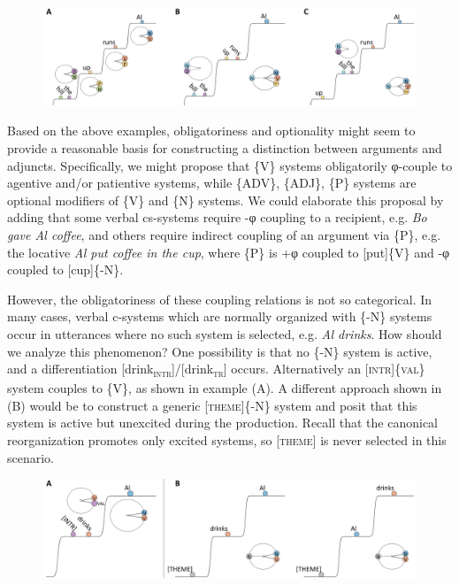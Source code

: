   
\begin{figure}
\includegraphics[width=\textwidth]{figures/Tilsen-img85.png}
\caption{\missingcaption}
\label{fig:4:35}
\end{figure}
 

  Based on the above examples, obligatoriness and optionality might seem to provide a reasonable basis for constructing a distinction between arguments and adjuncts. Specifically, we might propose that \{V\} systems obligatorily φ-couple to agentive and/or patientive systems, while \{ADV\}, \{ADJ\}, \{P\} systems are optional modifiers of \{V\} and \{N\} systems. We could elaborate this proposal by adding that some verbal cs-systems require -φ coupling to a recipient, e.g. \textit{Bo gave Al coffee}, and others require indirect coupling of an argument via \{P\}, e.g. the locative \textit{Al put coffee in the cup}, where \{P\} is +φ coupled to [put]\{V\} and -φ coupled to [cup]\{-N\}.

  However, the obligatoriness of these coupling relations is not so categorical. In many cases, verbal c-systems which are normally organized with \{-N\} systems occur in utterances where no such system is selected, e.g. \textit{Al drinks}. How should we analyze this phenomenon? One possibility is that no \{-N\} system is active, and a differentiation [drink\textsc{\textsubscript{intr}}]/[drink\textsc{\textsubscript{tr}}] occurs. Alternatively an [\textsc{intr}]\{\textsc{val}\} system couples to \{V\}, as shown in example (A). A different approach shown in (B) would be to construct a generic [\textsc{theme}]\{-N\} system and posit that this system is active but unexcited during the production. Recall that the canonical reorganization promotes only excited systems, so [\textsc{theme}] is never selected in this scenario. 

  
\begin{figure}
\includegraphics[width=\textwidth]{figures/Tilsen-img86.png}
\caption{\missingcaption}
\label{fig:4:36}
\end{figure}
 

